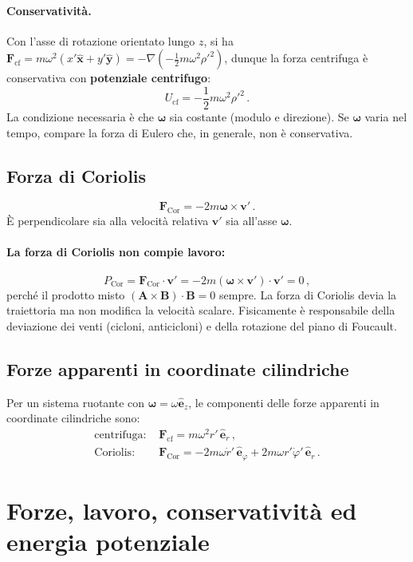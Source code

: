 \documentclass[11pt,a4paper]{article}
\renewcommand{\vec}[1]{\bm{#1}}
\newcommand{\er}{\hat{\bm{e}}_r}
\newcommand{\ephi}{\hat{\bm{e}}_\varphi}
\newcommand{\ez}{\hat{\bm{e}}_z}
\newcommand{\om}{\vec{\omega}}
\theoremstyle{plain}
\theoremstyle{definition}
\theoremstyle{remark}
\begin{document}
\paragraph{Conservatività.}
Con l'asse di rotazione orientato lungo $z$, si ha
$\vec{F}_\mathrm{cf}=m\omega^2(x'\hat{\bm{x}}+y'\hat{\bm{y}})
=-\nabla\left(-\tfrac{1}{2}m\omega^2\rho'^2\right)$,
dunque la forza centrifuga è conservativa con \textbf{potenziale centrifugo}:
\[
  U_\mathrm{cf}=-\frac{1}{2}m\omega^2\rho'^2\,.
\]
La condizione necessaria è che $\om$ sia costante (modulo e direzione). Se
$\om$ varia nel tempo, compare la forza di Eulero che, in generale, non è
conservativa.

\subsection{Forza di Coriolis}

\[
  \vec{F}_\mathrm{Cor}=-2m\om\times\vec{v}'\,.
\]
È perpendicolare sia alla velocità relativa $\vec{v}'$ sia all'asse $\om$.
\paragraph{La forza di Coriolis non compie lavoro:}
\[
  P_\mathrm{Cor}=\vec{F}_\mathrm{Cor}\cdot\vec{v}'
               =-2m(\om\times\vec{v}')\cdot\vec{v}'=0\,,
\]
perché il prodotto misto $(\vec{A}\times\vec{B})\cdot\vec{B}=0$ sempre.
La forza di Coriolis devia la traiettoria ma non modifica la velocità scalare.
Fisicamente è responsabile della deviazione dei venti (cicloni, anticicloni)
e della rotazione del piano di Foucault.

\subsection{Forze apparenti in coordinate cilindriche}

Per un sistema ruotante con $\om=\omega\ez$, le componenti delle forze
apparenti in coordinate cilindriche sono:
\begin{align*}
  \text{centrifuga: }&\vec{F}_\mathrm{cf}=m\omega^2 r'\,\er\,,\\
  \text{Coriolis: }&\vec{F}_\mathrm{Cor}=-2m\omega\dot r'\,\ephi + 2m\omega r'\dot\varphi'\,\er\,.
\end{align*}

\section{Forze, lavoro, conservatività ed energia potenziale}
\end{document}

